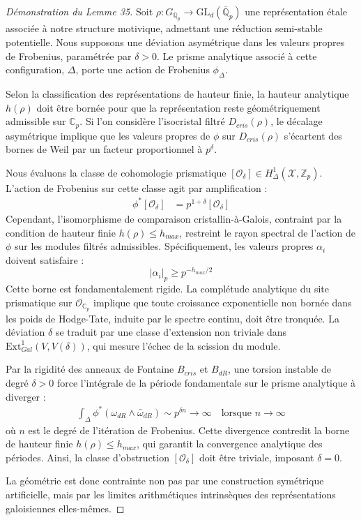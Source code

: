 \documentclass[
]{article}
\begin{document}
\begin{proof}[Démonstration du Lemme 35]
Soit $\rho: G_{\mathbb{Q}_p} \to \mathrm{GL}_d(\overline{\mathbb{Q}}_p)$ une représentation étale associée à notre structure motivique, admettant une réduction semi-stable potentielle. Nous supposons une déviation asymétrique dans les valeurs propres de Frobenius, paramétrée par $\delta > 0$. Le prisme analytique associé à cette configuration, $\Delta$, porte une action de Frobenius $\phi_\Delta$.

Selon la classification des représentations de hauteur finie, la hauteur analytique $h(\rho)$ doit être bornée pour que la représentation reste géométriquement admissible sur $\mathbb{C}_p$. Si l'on considère l'isocristal filtré $D_{cris}(\rho)$, le décalage asymétrique implique que les valeurs propres de $\phi$ sur $D_{cris}(\rho)$ s'écartent des bornes de Weil par un facteur proportionnel à $p^\delta$.

Nous évaluons la classe de cohomologie prismatique $[\mathcal{O}_\delta] \in H^1_{\Delta}(\mathcal{X}, \mathbb{Z}_p)$. L'action de Frobenius sur cette classe agit par amplification :
\begin{align*}
\phi^* [\mathcal{O}_\delta] &= p^{1 + \delta} [\mathcal{O}_\delta]
\end{align*}
Cependant, l'isomorphisme de comparaison cristallin-à-Galois, contraint par la condition de hauteur finie $h(\rho) \leq h_{max}$, restreint le rayon spectral de l'action de $\phi$ sur les modules filtrés admissibles. Spécifiquement, les valeurs propres $\alpha_i$ doivent satisfaire :
\begin{equation*}
|\alpha_i|_p \geq p^{-h_{max}/2}
\end{equation*}
Cette borne est fondamentalement rigide. La complétude analytique du site prismatique sur $\mathcal{O}_{\mathbb{C}_p}$ implique que toute croissance exponentielle non bornée dans les poids de Hodge-Tate, induite par le spectre continu, doit être tronquée. La déviation $\delta$ se traduit par une classe d'extension non triviale dans $\mathrm{Ext}^1_{Gal}(V, V(\delta))$, qui mesure l'échec de la scission du module.

Par la rigidité des anneaux de Fontaine $B_{cris}$ et $B_{dR}$, une torsion instable de degré $\delta > 0$ force l'intégrale de la période fondamentale sur le prisme analytique à diverger :
\begin{align*}
\int_{\Delta} \phi^* (\omega_{dR} \wedge \bar{\omega}_{dR}) \sim p^{\delta n} \to \infty \quad \text{lorsque } n \to \infty
\end{align*}
où $n$ est le degré de l'itération de Frobenius. Cette divergence contredit la borne de hauteur finie $h(\rho) \leq h_{max}$, qui garantit la convergence analytique des périodes. Ainsi, la classe d'obstruction $[\mathcal{O}_\delta]$ doit être triviale, imposant $\delta = 0$.

La géométrie est donc contrainte non pas par une construction symétrique artificielle, mais par les limites arithmétiques intrinsèques des représentations galoisiennes elles-mêmes.
\end{proof}
\end{document}
